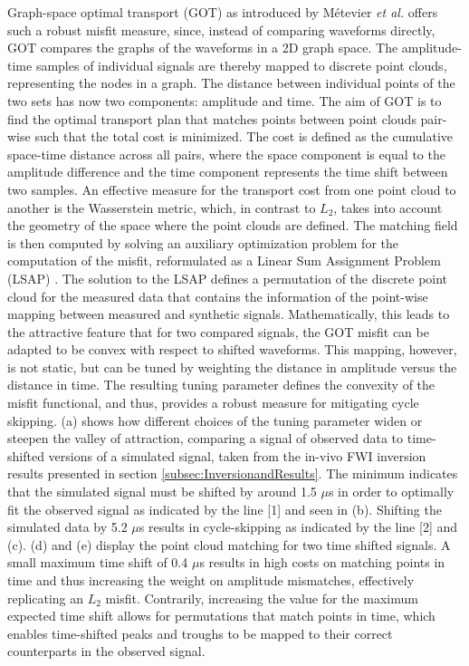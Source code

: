 \documentclass[12pt]{iopart}
\begin{document}
Graph-space optimal transport (GOT) as introduced by Métevier \textit{et al.} \cite{Metevier_GOT_2019} offers such a robust misfit measure, since, instead of comparing waveforms directly, GOT compares the graphs of the waveforms in a 2D graph space. The amplitude-time samples of individual signals are thereby mapped to discrete point clouds, representing the nodes in a graph. The distance between individual points of the two sets has now two components: amplitude and time. The aim of GOT is to find the optimal transport plan that matches points between point clouds pair-wise such that the total cost is minimized. The cost is defined as the cumulative space-time distance across all pairs, where the space component is equal to the amplitude difference and the time component represents the time shift between two samples. An effective measure for the transport cost from one point cloud to another is the Wasserstein metric, which, in contrast to $L_2$, takes into account the geometry of the space where the point clouds are defined. The matching field is then computed by solving an auxiliary optimization problem for the computation of the misfit, reformulated as a Linear Sum Assignment Problem (LSAP) \cite{Boehm_OPT_2022}. The solution to the LSAP defines a permutation of the discrete point cloud for the measured data that contains the information of the point-wise mapping between measured and synthetic signals. Mathematically, this leads to the attractive feature that for two compared signals, the GOT misfit can be adapted to be convex with respect to shifted waveforms. This mapping, however, is not static, but can be tuned by weighting the distance in amplitude versus the distance in time. The resulting tuning parameter defines the convexity of the misfit functional, and thus, provides a robust measure for mitigating cycle skipping. (a) shows how different choices of the tuning parameter widen or steepen the valley of attraction, comparing a signal of observed data to time-shifted versions of a simulated signal, taken from the in-vivo FWI inversion results presented in section \ref{subsec:InversionandResults}. The minimum indicates that the simulated signal must be shifted by around 1.5 $\mu$s in order to optimally fit the observed signal as indicated by the line [1] and seen in (b). Shifting the simulated data by 5.2 $\mu$s results in cycle-skipping as indicated by the line [2] and (c). (d) and (e) display the point cloud matching for two time shifted signals. A small maximum time shift of 0.4 $\mu$s results in high costs on matching points in time and thus increasing the weight on amplitude mismatches, effectively replicating an $L_2$ misfit. Contrarily, increasing the value for the maximum expected time shift allows for permutations that match points in time, which enables time-shifted peaks and troughs to be mapped to their correct counterparts in the observed signal.
\end{document}
